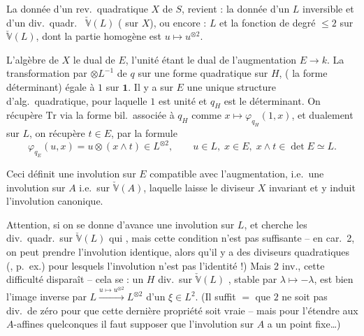 \documentclass[11pt,a4paper]{article}
\begin{document}
La  donnée d'un rev.\ quadratique $X$ de $S$, revient : la donnée d'un  $L$ inversible et d'un div.\ quadr.\  $\check{\mathbb{V}}(L)$ ( sur $X$), ou encore : $L$ et la fonction de degré $\leq 2$ sur $\check{\mathbb{V}}(L)$, dont la partie homogène est $u \mapsto u^{\otimes 2}$.

 L'algèbre de $X$  le dual  de $E$, l'unité étant le dual de l'augmentation $E \to k$. La transformation par $\otimes L^{-1}$ de $q$ sur une forme quadratique sur $H$, ( la forme déterminant) égale à $1$ sur $\mathbf{1}$. Il y a sur $E$ une unique structure  d'alg.\ quadratique, pour laquelle $1$ est unité et $q_H$ est le déterminant. On récupère $\mathrm{Tr}$  via la forme bil.\ associée à $q_H$ comme $x \mapsto \varphi_{q_H}(1,x)$, et dualement sur $L$, on récupère $t \in E$,  par la formule
\[
  \varphi_{q_E}(u, x) = u \otimes (x \wedge t) \in L^{\otimes 2},
  \qquad u \in L,\; x \in E,\; x\wedge t \in \det E \simeq L .
\]

Ceci définit  une involution sur $E$ compatible avec l'augmentation, i.e.\ une involution sur $A$ i.e.\ sur $\check{\mathbb{V}}(A)$, laquelle laisse le diviseur $X$ invariant et y induit l'involution canonique.

Attention, si on se donne d'avance une involution sur $L$, et cherche les div.\ quadr.\ sur $\check{\mathbb{V}}(L)$ qui   , mais cette condition n'est pas suffisante -- en car.\ 2, on peut prendre l'involution identique, alors qu'il y a des diviseurs quadratiques (\ill{}, p.~ex.) pour lesquels l'involution n'est pas l'identité !) Mais  2 inv., cette difficulté disparaît -- cela se  : un $H$ div.\ sur $\check{\mathbb{V}}(L)$ , stable par $\lambda \mapsto -\lambda$, est bien l'image inverse par $L \xrightarrow{u \mapsto u^{\otimes 2}} L^{\otimes 2}$ d'un \struck{\ill{}} $\xi \in L^{2}$. (Il suffit $=$ que $2$ ne soit pas div.\ de zéro \struck{\ill{}} pour que cette dernière propriété soit vraie -- mais pour l'étendre aux $A$-affines quelconques il faut supposer que l'involution sur $A$ a un point fixe…)
\end{document}
